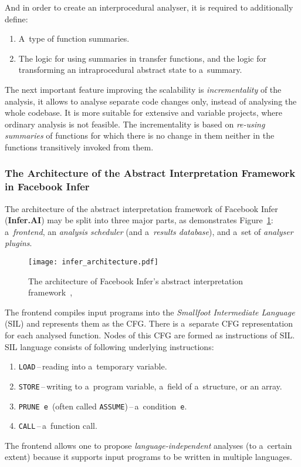 And in order to create an interprocedural analyser, it is required to
additionally define:
\begin{enumerate}
    \item
        A~type of function summaries.

    \item
        The logic for using summaries in transfer functions, and the logic
        for transforming an intraprocedural abstract state to
        a~summary.
\end{enumerate}
The next important feature improving the scalability is
\emph{incrementality} of the analysis, it allows to analyse separate
code changes only, instead of analysing the whole codebase. It is more
suitable for extensive and variable projects, where ordinary analysis
is not feasible. The incrementality is based on \emph{re-using summaries}
of functions for which there is no change in them neither in the functions
transitively invoked from them.

\subsubsection{%
    The Architecture of the Abstract Interpretation Framework in
    Facebook Infer
}

The architecture of the abstract interpretation framework of Facebook
Infer (\textbf{Infer.AI}) may be split into three major parts,
as demonstrates Figure~\ref{fig:inferArch}: a~\emph{frontend},
an \emph{analysis scheduler} (and a~\emph{results database}), and a~set of
\emph{analyser plugins}.

\begin{figure}[hbt]
    \centering
    \texttt{[image: infer\_architecture.pdf]}
    \caption{%
        The architecture of Facebook Infer's abstract interpretation
        framework~\cite{inferAISlides}, \cite{projectPracticeMarcin2018}
    }
    \label{fig:inferArch}
\end{figure}

The frontend compiles input programs into the \emph{Smallfoot Intermediate
Language} (SIL) and represents them as the CFG. There is a~separate CFG
representation for each analysed function. Nodes of this CFG are formed as
instructions of SIL. SIL language consists of following underlying
instructions:
\begin{enumerate}
    \item
        \texttt{LOAD}\,--\,reading into a~temporary variable.

    \item
        \texttt{STORE}\,--\,writing to a~program variable,
        a~field of a~structure, or an array.

    \item
        \texttt{PRUNE~e}~(often called
        \texttt{ASSUME})\,--\,a~condition~\texttt{e}.

    \item
        \texttt{CALL}\,--\,a~function call.
\end{enumerate}
The frontend allows one to propose \emph{language-independent} analyses
(to a~certain extent) because it supports input programs to be written
in multiple languages.

